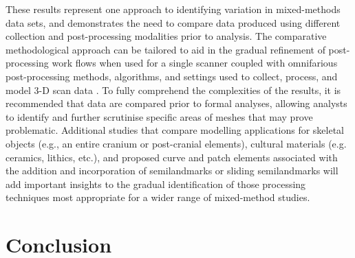 \documentclass[review]{elsarticle}
\begin{document}
These results represent one approach to identifying variation in mixed-methods data sets, and demonstrates the need to compare data produced using different collection and post-processing modalities prior to analysis. The comparative methodological approach can be tailored to aid in the gradual refinement of post-processing work flows when used for a single scanner coupled with omnifarious post-processing methods, algorithms, and settings used to collect, process, and model 3-D scan data \citep[22-23 and Figure 2]{RN11473}. To fully comprehend the complexities of the results, it is recommended that data are compared prior to formal analyses, allowing analysts to identify and further scrutinise specific areas of meshes that may prove problematic. Additional studies that compare modelling applications for skeletal objects (e.g., an entire cranium or post-cranial elements), cultural materials (e.g. ceramics, lithics, etc.), and proposed curve and patch elements associated with the addition and incorporation of semilandmarks or sliding semilandmarks will add important insights to the gradual identification of those processing techniques most appropriate for a wider range of mixed-method studies.

\section{Conclusion}
\end{document}
